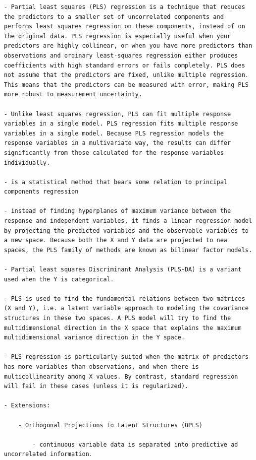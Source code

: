 \documentclass[
]{book}
\begin{document}
\begin{verbatim}
- Partial least squares (PLS) regression is a technique that reduces the predictors to a smaller set of uncorrelated components and performs least squares regression on these components, instead of on the original data. PLS regression is especially useful when your predictors are highly collinear, or when you have more predictors than observations and ordinary least-squares regression either produces coefficients with high standard errors or fails completely. PLS does not assume that the predictors are fixed, unlike multiple regression. This means that the predictors can be measured with error, making PLS more robust to measurement uncertainty.

- Unlike least squares regression, PLS can fit multiple response variables in a single model. PLS regression fits multiple response variables in a single model. Because PLS regression models the response variables in a multivariate way, the results can differ significantly from those calculated for the response variables individually.

- is a statistical method that bears some relation to principal components regression

- instead of finding hyperplanes of maximum variance between the response and independent variables, it finds a linear regression model by projecting the predicted variables and the observable variables to a new space. Because both the X and Y data are projected to new spaces, the PLS family of methods are known as bilinear factor models.

- Partial least squares Discriminant Analysis (PLS-DA) is a variant used when the Y is categorical.

- PLS is used to find the fundamental relations between two matrices (X and Y), i.e. a latent variable approach to modeling the covariance structures in these two spaces. A PLS model will try to find the multidimensional direction in the X space that explains the maximum multidimensional variance direction in the Y space.

- PLS regression is particularly suited when the matrix of predictors has more variables than observations, and when there is multicollinearity among X values. By contrast, standard regression will fail in these cases (unless it is regularized).

- Extensions:

    - Orthogonal Projections to Latent Structures (OPLS)

        - continuous variable data is separated into predictive ad uncorrelated information.


\end{verbatim}
\end{document}

